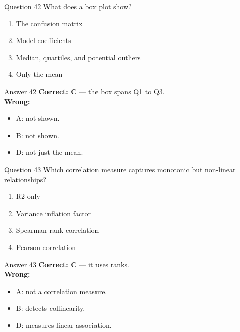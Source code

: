 \documentclass[aspectratio=169,11pt]{beamer}
\begin{document}
\begin{frame}{Question 42}
What does a box plot show?
\begin{enumerate}[label=\Alph*.]
\item The confusion matrix
\item Model coefficients
\item Median, quartiles, and potential outliers
\item Only the mean
\end{enumerate}
\end{frame}
\begin{frame}{Answer 42}
\textbf{Correct: C} --- the box spans Q1 to Q3.\\
\vspace{0.5em}
\textbf{Wrong:}
\begin{itemize}
\item A: not shown.
\item B: not shown.
\item D: not just the mean.
\end{itemize}
\end{frame}

\begin{frame}{Question 43}
Which correlation measure captures monotonic but non-linear relationships?
\begin{enumerate}[label=\Alph*.]
\item R2 only
\item Variance inflation factor
\item Spearman rank correlation
\item Pearson correlation
\end{enumerate}
\end{frame}
\begin{frame}{Answer 43}
\textbf{Correct: C} --- it uses ranks.\\
\vspace{0.5em}
\textbf{Wrong:}
\begin{itemize}
\item A: not a correlation measure.
\item B: detects collinearity.
\item D: measures linear association.
\end{itemize}
\end{frame}
\end{document}
